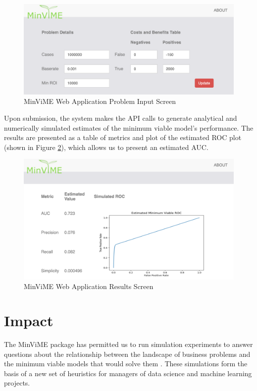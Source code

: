 \documentclass[preprint,12pt, a4paper]{elsarticle}
\begin{document}
\begin{figure}[h!]
\includegraphics[scale=0.5]{images/Screen1.png}
\caption{MinViME Web Application Problem Input Screen}
\label{screen1}
\end{figure}

Upon submission, the system makes the API calls to generate analytical and
numerically simulated estimates of the minimum viable model's performance. The results
are presented as a table of metrics and plot of the estimated ROC plot (shown in Figure \ref{screen2}), which allows us to present an estimated AUC\cite{Bradley97}.
 
\begin{figure}[h!]
\includegraphics[scale=0.5]{images/Screen2.png}
\caption{MinViME Web Application Results Screen}
\label{screen2}
\end{figure}

\section{Impact}

The MinViME package has permitted us to run simulation experiments to answer questions
about the relationship between the landscape of business problems and the minimum 
viable models that would solve them \cite{Hawkins2020}.
These simulations form the basis of a new set of heuristics for managers of data science
and machine learning projects.
\end{document}
